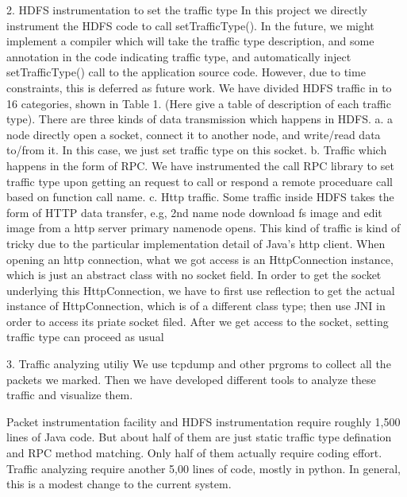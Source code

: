 2. HDFS instrumentation to set the traffic type
     In this project we directly instrument the HDFS code to call setTrafficType(). In the future, we might implement a compiler which will take the traffic type description, and some annotation in the code indicating traffic type, and automatically inject setTrafficType() call to the application source code. However, due to time constraints, this is deferred as future work. 
       We have divided HDFS traffic in to 16 categories, shown in Table 1. (Here give a table of description of each traffic type). There are three kinds of data transmission which happens in HDFS.
     a. a node directly open a socket, connect it to another node, and write/read data to/from it. In this case, we just set traffic type on this socket. 
     b. Traffic which happens in the form of RPC. We have instrumented the call RPC library to set traffic type upon getting an request to call or respond a remote proceduare call based on function call name. 
     c. Http traffic. Some traffic inside HDFS takes the form of HTTP data transfer, e.g, 2nd name node download fs image and edit image from a http server primary namenode opens. This kind of traffic is kind of tricky due to the particular implementation detail of Java's http client. When opening an http connection, what we got access is an HttpConnection instance, which is just an abstract class with no socket field. In order to get the socket underlying this HttpConnection, we have to first use reflection to get the actual instance of HttpConnection, which is of a different class type; then use JNI in order to access its priate socket filed. After we get access to the socket, setting traffic type can proceed as usual 

3. Traffic analyzing utiliy
    We use tcpdump and other prgroms to collect all the packets we marked. Then we have developed different tools to analyze these traffic and visualize them. 

Packet instrumentation facility and HDFS instrumentation require roughly 1,500 lines of Java code. But about half of them are just static traffic type defination and RPC method matching. Only half of them actually require coding effort. Traffic analyzing require another 5,00 lines of code, mostly in python. In general, this is a modest change to the current system.

